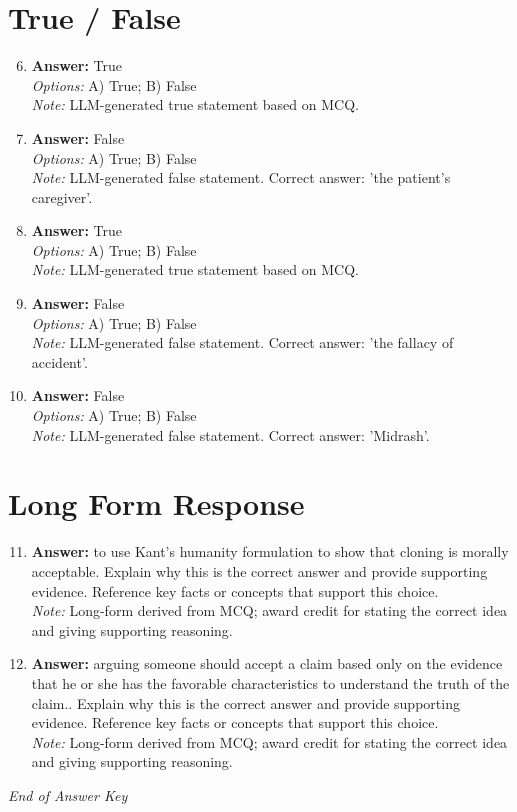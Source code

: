\documentclass[12pt]{article}
\begin{document}
\section*{True / False}
\begin{enumerate}[label=\arabic*.]
\setcounter{enumi}{5}
\item \textbf{Answer:} True
\\ \textit{Options:} A) True; B) False
\\ \textit{Note:} LLM-generated true statement based on MCQ.
\item \textbf{Answer:} False
\\ \textit{Options:} A) True; B) False
\\ \textit{Note:} LLM-generated false statement. Correct answer: 'the patient's caregiver'.
\item \textbf{Answer:} True
\\ \textit{Options:} A) True; B) False
\\ \textit{Note:} LLM-generated true statement based on MCQ.
\item \textbf{Answer:} False
\\ \textit{Options:} A) True; B) False
\\ \textit{Note:} LLM-generated false statement. Correct answer: 'the fallacy of accident'.
\item \textbf{Answer:} False
\\ \textit{Options:} A) True; B) False
\\ \textit{Note:} LLM-generated false statement. Correct answer: 'Midrash'.
\end{enumerate}

\section*{Long Form Response}
\begin{enumerate}[label=\arabic*.]
\setcounter{enumi}{10}
\item \textbf{Answer:} to use Kant's humanity formulation to show that cloning is morally acceptable. Explain why this is the correct answer and provide supporting evidence. Reference key facts or concepts that support this choice.
\\ \textit{Note:} Long-form derived from MCQ; award credit for stating the correct idea and giving supporting reasoning.
\item \textbf{Answer:} arguing someone should accept a claim based only on the evidence that he or she has the favorable characteristics to understand the truth of the claim.. Explain why this is the correct answer and provide supporting evidence. Reference key facts or concepts that support this choice.
\\ \textit{Note:} Long-form derived from MCQ; award credit for stating the correct idea and giving supporting reasoning.
\end{enumerate}

\vfill
\noindent\textit{End of Answer Key}
\end{document}
